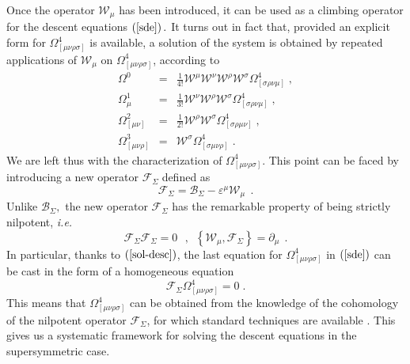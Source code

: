 \documentclass[a4paper,12pt]{article}
\begin{document}
Once the operator $\mathcal{W}_{\mu }$ has been introduced, it can be used
as a climbing operator for the descent equations $\left( \ref{sde}\right) .$
It turns out in fact that, provided an explicit form for $\Omega _{[\mu \nu
\rho \sigma ]}^{4}$ is available, a solution of the system is obtained by
repeated applications of $\mathcal{W}_{\mu }$ on $\Omega _{[\mu \nu \rho
\sigma ]}^{4}$, according to 
\begin{eqnarray}
\Omega ^{0} &=&\frac{1}{4!}\mathcal{W}^{\mu }\mathcal{W}^{\nu }\mathcal{W}%
^{\rho }\mathcal{W}^{\sigma }\Omega _{[\sigma \rho \nu \mu ]}^{4}\;, 
\nonumber \\
\Omega _{\mu }^{1} &=&\frac{1}{3!}\mathcal{W}^{\nu }\mathcal{W}^{\rho }%
\mathcal{W}^{\sigma }\Omega _{[\sigma \rho \nu \mu ]}^{4}\;,  \nonumber \\
\Omega _{[\mu \nu ]}^{2} &=&\frac{1}{2!}\mathcal{W}^{\rho }\mathcal{W}%
^{\sigma }\Omega _{[\sigma \rho \mu \nu ]}^{4}\;,  \nonumber \\
\Omega _{[\mu \nu \rho ]}^{3} &=&\mathcal{W}^{\sigma }\Omega _{[\sigma \mu
\nu \rho ]}^{4}\;.  \label{sol-desc}
\end{eqnarray}
We are left thus with the characterization of $\Omega _{[\mu \nu \rho \sigma
]}^{4}.$ This point can be faced by introducing a new operator $\mathcal{F}%
_{\Sigma }\;$defined as 
\begin{equation}
\mathcal{F}_{\Sigma }=\mathcal{B}_{\Sigma }-\varepsilon ^{\mu }\mathcal{W}%
_{\mu }\,\;.  \label{newb}
\end{equation}
Unlike $\mathcal{B}_{\Sigma },$ the new operator $\mathcal{F}_{\Sigma }$ has
the remarkable property of being strictly nilpotent, \textit{i.e.} 
\[
\mathcal{F}_{\Sigma }\mathcal{F}_{\Sigma }=0\,\,\,\,,\,\,\,\left\{ \mathcal{W%
}_{\mu },\mathcal{F}_{\Sigma }\right\} =\partial _{\mu }\;\,. 
\]
In particular, thanks to $\left( \ref{sol-desc}\right) $, the last equation
for $\Omega _{[\mu \nu \rho \sigma ]}^{4}$ in $\left( \ref{sde}\right) $ can
be cast in the form of a homogeneous equation 
\begin{equation}
\mathcal{F}_{\Sigma }\Omega _{[\mu \nu \rho \sigma ]}^{4}=0\;.  \label{h-e}
\end{equation}
This means that $\Omega _{[\mu \nu \rho \sigma ]}^{4}$ can be obtained from
the knowledge of the cohomology of the nilpotent operator $\mathcal{F}%
_{\Sigma }$, for which standard techniques are available \cite{pr}. This
gives us a systematic framework for solving the descent equations in the
supersymmetric case.
\end{document}
